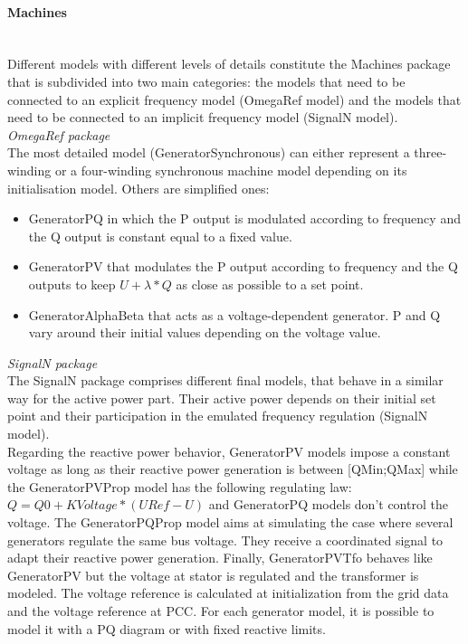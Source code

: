 \documentclass[a4paper, 12pt]{report}
\begin{document}
\paragraph{Machines}
~~\\

Different models with different levels of details constitute the Machines package that is subdivided into two main categories: the models that need to be connected to an explicit frequency model (OmegaRef model) and the models that need to be connected to an implicit frequency model (SignalN model). \\

\textit{OmegaRef package} \\

The most detailed model (GeneratorSynchronous) can either represent a three-winding or a four-winding synchronous machine model depending on its initialisation model. Others are simplified ones:
\begin{itemize}
\item GeneratorPQ in which the P output is modulated according to frequency and the Q output is constant equal to a fixed value.
\item GeneratorPV that modulates the P output according to frequency and the Q outputs to keep $U + \lambda * Q$ as close as possible to a set point.
\item GeneratorAlphaBeta that acts as a voltage-dependent generator. P and Q vary around their initial values depending on the voltage value.
\end{itemize}
\medskip

\textit{SignalN package} \\

The SignalN package comprises different final models, that behave in a similar way for the active power part. Their active power depends on their initial set point and their participation in the emulated frequency regulation (SignalN model). \\
Regarding the reactive power behavior, GeneratorPV models impose a constant voltage as long as their reactive power generation is between [QMin;QMax] while the GeneratorPVProp model has the following regulating law: $Q = Q0 + KVoltage * (URef - U)$ and GeneratorPQ models don't control the voltage. The GeneratorPQProp model aims at simulating the case where several generators regulate the same bus voltage. They receive a coordinated signal to adapt their reactive power generation. Finally, GeneratorPVTfo behaves like GeneratorPV but the voltage at stator is regulated and the transformer is modeled. The voltage reference is calculated at initialization from the grid data and the voltage reference at PCC. For each generator model, it is possible to model it with a PQ diagram or with fixed reactive limits.
\end{document}
